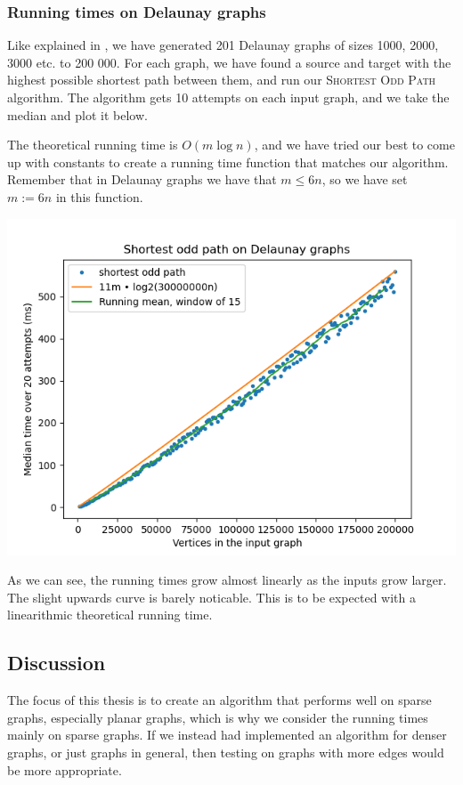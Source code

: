 \subsubsection{Running times on Delaunay graphs}
\label{subsubsection:odd-path-delaunay-testing}
Like explained in , we have generated 201 Delaunay graphs of sizes 1000, 2000, 3000 etc. to 200 000. For each graph, we have found a source and target with the highest possible shortest path between them, and run our \textsc{Shortest Odd Path} algorithm. The algorithm gets 10 attempts on each input graph, and we take the median and plot it below.

The theoretical running time is $O(m \log n)$, and we have tried our best to come up with constants to create a running time function that matches our algorithm. Remember that in Delaunay graphs we have that $m \leq 6n$, so we have set $m := 6n$ in this function.

\includegraphics[width=15cm]{figures/bench_plots/shortest odd path.png}

As we can see, the running times grow almost linearly as the inputs grow larger. The slight upwards curve is barely noticable. This is to be expected with a linearithmic theoretical running time.

\subsection{Discussion}
The focus of this thesis is to create an algorithm that performs well on sparse graphs, especially planar graphs, which is why we consider the running times mainly on sparse graphs. If we instead had implemented an algorithm for denser graphs, or just graphs in general, then testing on graphs with more edges would be more appropriate.
